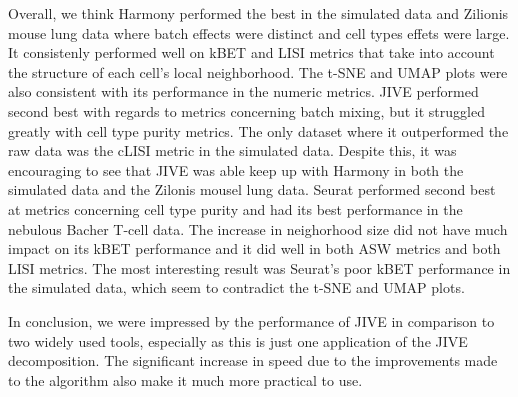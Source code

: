 \documentclass[
12pt, %
letterpaper, %
oneside, %
headinclude,footinclude, %
BCOR5mm, %
]{scrartcl}
\begin{document}
Overall, we think Harmony performed the best in the simulated data and Zilionis mouse lung data where batch effects were distinct and cell types effets were large. It consistenly performed well on kBET and LISI metrics that take into account the structure of each cell's local neighborhood. The t-SNE and UMAP plots were also consistent with its performance in the numeric metrics. JIVE performed second best with regards to metrics concerning batch mixing, but it struggled greatly with cell type purity metrics. The only dataset where it outperformed the raw data was the cLISI metric in the simulated data. Despite this, it was encouraging to see that JIVE was able keep up with Harmony in both the simulated data and the Zilonis mousel lung data. Seurat performed second best at metrics concerning cell type purity and had its best performance in the nebulous Bacher T-cell data. The increase in neighorhood size did not have much impact on its kBET performance and it did well in both ASW metrics and both LISI metrics. The most interesting result was Seurat's poor kBET performance in the simulated data, which seem to contradict the t-SNE and UMAP plots. 

In conclusion, we were impressed by the performance of JIVE in comparison to two widely used tools, especially as this is just one application of the JIVE decomposition. The significant increase in speed due to the improvements made to the algorithm also make it much more practical to use. 


\renewcommand{\refname}{\spacedlowsmallcaps{References}} %


% 

\end{document}

